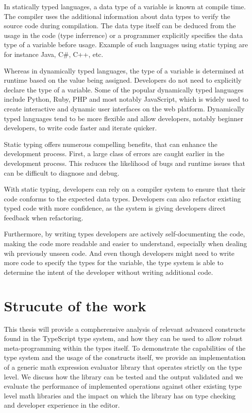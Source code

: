 In statically typed languages, a data type of a variable is known at compile time. The compiler uses the additional information about data types to verify the source code during compilation. The data type itself can be deduced from the usage in the code (type inferrence) or a programmer explicitly specifies the data type of a variable before usage. Example of such languages using static typing are for instance Java, C\#, C++, etc.

Whereas in dynamically typed languages, the type of a variable is determined at runtime based on the value being assigned. Developers do not need to explicitly declare the type of a variable. Some of the popular dynamically typed languages include Python, Ruby, PHP and most notably JavaScript, which is widely used to create interactive and dynamic user interfaces on the web platform. Dynamically typed languages tend to be more flexible and allow developers, notably beginner developers, to write code faster and iterate quicker.

Static typing offers numerous compelling benefits, that can enhance the development process. First, a large class of errors are caught earlier in the development process. This reduces the likelihood of bugs and runtime issues that can be difficult to diagnose and debug. 

With static typing, developers can rely on a compiler system to ensure that their code conforms to the expected data types. Developers can also refactor existing typed code with more confidence, as the system is giving developers direct feedback when refactoring. 

Furthermore, by writing types developers are actively self-documenting the code, making the code more readable and easier to understand, especially when dealing wih previously unseen code. And even though developers might need to write more code to specify the types for the variable, the type system is able to determine the intent of the developer without writing additional code. 

\section{Strucute of the work}

This thesis will provide a compherensive analysis of relevant advanced constructs found in the TypeScript type system, and how they can be used to allow robust meta-programming within the types itself. To demonstrate the capabilities of the type system and the usage of the constructs itself, we provide an implementation of a generic math expression evaluator library that operates strictly on the type level. We discuss how the library can be tested and the output validated and we evaluate the performance of implemented operations against other existing type level math libraries and the impact on which the library has on type checking and developer experience in the editor.